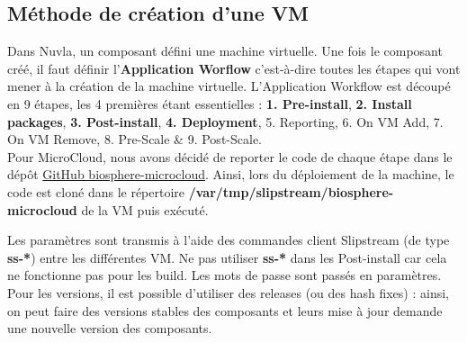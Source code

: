 \subsection{Méthode de création d'une VM}

Dans Nuvla, un composant défini une machine virtuelle. Une fois le composant créé, il faut définir l'\textbf{Application Worflow} c'est-à-dire toutes les étapes qui vont mener à la création de la machine virtuelle.
L'Application Workflow est découpé en 9 étapes, les 4 premières étant essentielles : \textbf{1. Pre-install}, \textbf{2. Install packages}, \textbf{3. Post-install}, \textbf{4. Deployment}, 5. Reporting, 6. On VM Add, 7. On VM Remove, 8. Pre-Scale \& 9. Post-Scale.\\

Pour MicroCloud, nous avons décidé de reporter le code de chaque étape dans le dépôt \href{https://github.com/IFB-ElixirFr/biosphere-microcloud}{GitHub biosphere-microcloud}. Ainsi, lors du déploiement de la machine, le code est cloné dans le répertoire \textbf{/var/tmp/slipstream/biosphere-microcloud} de la VM puis exécuté.
\newline

Les paramètres sont transmis à l'aide des commandes client Slipstream (de type \textbf{ss-*}) entre les différentes VM. Ne pas utiliser \textbf{ss-*} dans les Post-install car cela ne fonctionne pas pour les build. Les mots de passe sont passés en paramètres.
Pour les versions, il est possible d'utiliser des releases (ou des hash fixes) : ainsi, on peut faire des versions stables des composants et leurs mise à jour demande une nouvelle version des composants.